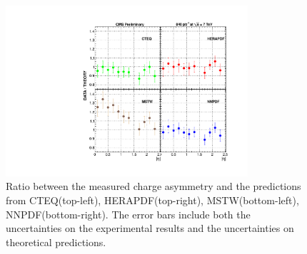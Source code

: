 \begin{figure}[htbp]
  \begin{center}
\includegraphics*[width=0.80\textwidth]{plotCarino}
  \caption[Ratio between the measured charge asymmetry and the predictions from
CTEQ(top-left), HERAPDF(top-right), MSTW(bottom-left), NNPDF(bottom-right). ]
{\label{fig:Carino} Ratio between the measured charge asymmetry and the
predictions from CTEQ(top-left), HERAPDF(top-right), MSTW(bottom-left),
NNPDF(bottom-right). The error bars include both the uncertainties on the
experimental results and the uncertainties on theoretical
predictions\cite{bendavid2011electron}.}
  \end{center}
\end{figure}

